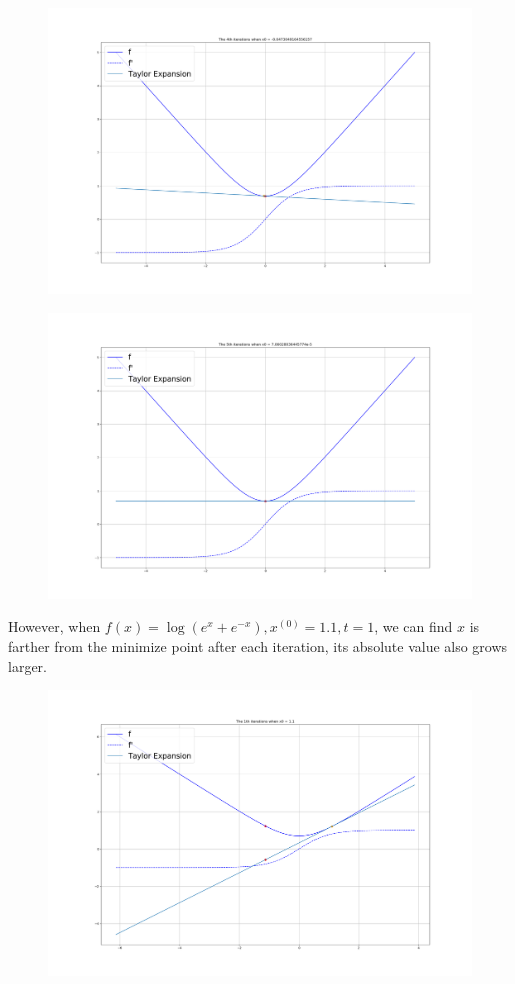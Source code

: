 \documentclass{article}
\theoremstyle{definition}
\theoremstyle{definition}
\theoremstyle{remark}
\begin{document}
\begin{enumerate}
\begin{figure}[H]
    \end{figure}
    \begin{figure}[H]
        \centering
        \includegraphics[scale=0.25]{f14.png}
    \end{figure}
    \begin{figure}[H]
        \centering
        \includegraphics[scale=0.25]{f15.png}
    \end{figure}
    However, when $f(x)=\log(e^x+e^{-x}),x^{(0)} = 1.1,t = 1$, we can find $x$ is farther from the minimize point after each iteration, its absolute value also grows larger.
    \begin{figure}[H]
        \centering
        \includegraphics[scale=0.25]{f21.png}

\end{figure}
\end{enumerate}
\end{document}
